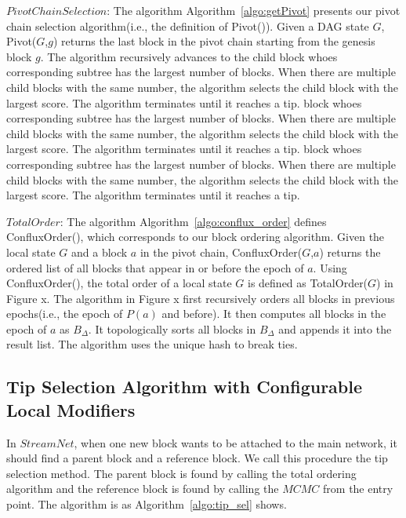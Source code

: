$Pivot Chain Selection$: The algorithm Algorithm~\ref{algo:getPivot} presents our pivot chain selection algorithm(i.e., the definition of Pivot()). Given a DAG state $G$, Pivot($G$,$g$) returns the last block in the pivot chain starting from the genesis block $g$. The algorithm recursively advances to the child block whoes corresponding subtree has the largest number of blocks. When there are multiple child blocks with the same number, the algorithm selects the child block with the largest score. The algorithm terminates until it reaches a tip. block whoes corresponding subtree has the largest number of blocks. When there are multiple child blocks with the same number, the algorithm selects the child block with the largest score. The algorithm terminates until it reaches a tip. block whoes corresponding subtree has the largest number of blocks. When there are multiple child blocks with the same number, the algorithm selects the child block with the largest score. The algorithm terminates until it reaches a tip. 



$Total Order$: The algorithm Algorithm~\ref{algo:conflux_order} defines ConfluxOrder(), which corresponds to our block ordering algorithm. Given the local state $G$ and a block $a$ in the pivot chain, ConfluxOrder($G$,$a$) returns the ordered list of all blocks that appear in or before the epoch of $a$. Using ConfluxOrder(), the total order of a local state $G$ is defined as TotalOrder($G$) in Figure x. The algorithm in Figure x first recursively orders all blocks in previous epochs(i.e., the epoch of $P(a)$ and before). It then computes all blocks in the epoch of $a$ as $B_\Delta$. It topologically sorts all blocks in $B_\Delta$ and appends it into the result list. The algorithm uses the unique hash to break ties. 




\subsection{Tip Selection Algorithm with Configurable Local Modifiers}

In $StreamNet$, when one new block wants to be attached to the main network, it should find a parent block and a reference block. We call this procedure the tip selection method. 
The parent block is found by calling the total ordering algorithm and the reference block is found by calling the $MCMC$ from the entry point. The algorithm is as Algorithm~\ref{algo:tip_sel} shows.

